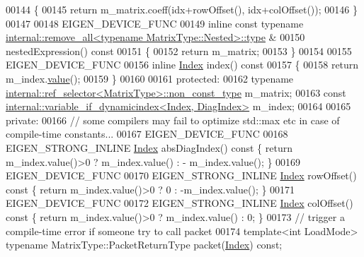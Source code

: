 \begin{DoxyCode}
00144 \textcolor{keyword}{    }\{
00145       \textcolor{keywordflow}{return} m\_matrix.coeff(idx+rowOffset(), idx+colOffset());
00146     \}
00147 
00148     EIGEN\_DEVICE\_FUNC
00149     \textcolor{keyword}{inline} \textcolor{keyword}{const} \textcolor{keyword}{typename} 
      \hyperlink{group___sparse_core___module}{internal::remove\_all<typename MatrixType::Nested>::type}
      & 
00150     nestedExpression()\textcolor{keyword}{ const }
00151 \textcolor{keyword}{    }\{
00152       \textcolor{keywordflow}{return} m\_matrix;
00153     \}
00154 
00155     EIGEN\_DEVICE\_FUNC
00156     \textcolor{keyword}{inline} \hyperlink{namespace_eigen_a62e77e0933482dafde8fe197d9a2cfde}{Index} index()\textcolor{keyword}{ const}
00157 \textcolor{keyword}{    }\{
00158       \textcolor{keywordflow}{return} m\_index.\hyperlink{group___sparse_core___module_a003ea53c6559b106406f7916d6610547}{value}();
00159     \}
00160 
00161   \textcolor{keyword}{protected}:
00162     \textcolor{keyword}{typename} \hyperlink{class_eigen_1_1internal_1_1_tensor_lazy_evaluator_writable}{internal::ref\_selector<MatrixType>::non\_const\_type}
       m\_matrix;
00163     \textcolor{keyword}{const} \hyperlink{class_eigen_1_1internal_1_1variable__if__dynamicindex}{internal::variable\_if\_dynamicindex<Index, DiagIndex>}
       m\_index;
00164 
00165   \textcolor{keyword}{private}:
00166     \textcolor{comment}{// some compilers may fail to optimize std::max etc in case of compile-time constants...}
00167     EIGEN\_DEVICE\_FUNC
00168     EIGEN\_STRONG\_INLINE \hyperlink{namespace_eigen_a62e77e0933482dafde8fe197d9a2cfde}{Index} absDiagIndex()\textcolor{keyword}{ const }\{ \textcolor{keywordflow}{return} m\_index.value()>0 ? m\_index.value() : -
      m\_index.value(); \}
00169     EIGEN\_DEVICE\_FUNC
00170     EIGEN\_STRONG\_INLINE \hyperlink{namespace_eigen_a62e77e0933482dafde8fe197d9a2cfde}{Index} rowOffset()\textcolor{keyword}{ const }\{ \textcolor{keywordflow}{return} m\_index.value()>0 ? 0 : -m\_index.value(); \}
00171     EIGEN\_DEVICE\_FUNC
00172     EIGEN\_STRONG\_INLINE \hyperlink{namespace_eigen_a62e77e0933482dafde8fe197d9a2cfde}{Index} colOffset()\textcolor{keyword}{ const }\{ \textcolor{keywordflow}{return} m\_index.value()>0 ? m\_index.value() : 0; \}
00173     \textcolor{comment}{// trigger a compile-time error if someone try to call packet}
00174     \textcolor{keyword}{template}<\textcolor{keywordtype}{int} LoadMode> \textcolor{keyword}{typename} MatrixType::PacketReturnType packet(\hyperlink{namespace_eigen_a62e77e0933482dafde8fe197d9a2cfde}{Index}) \textcolor{keyword}{const};

\end{DoxyCode}
